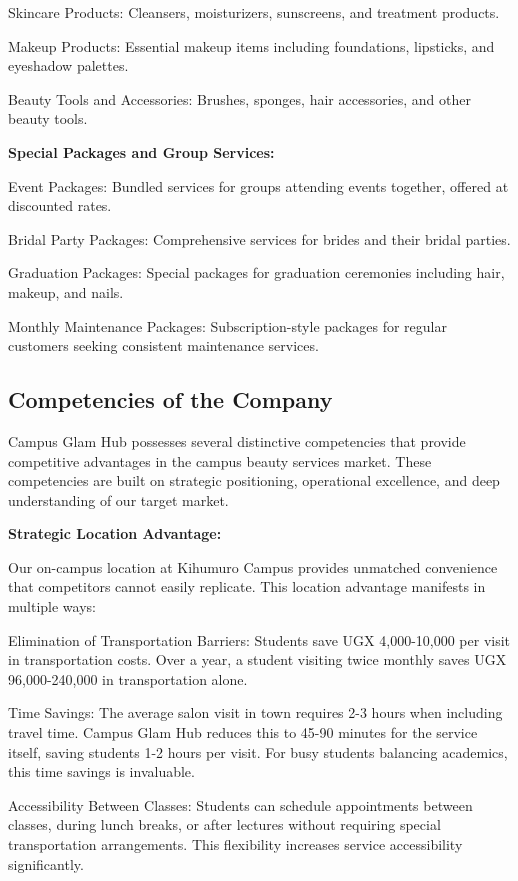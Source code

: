 \documentclass[a4paper,12pt]{article}
\begin{document}
Skincare Products: Cleansers, moisturizers, sunscreens, and treatment products.

Makeup Products: Essential makeup items including foundations, lipsticks, and eyeshadow palettes.

Beauty Tools and Accessories: Brushes, sponges, hair accessories, and other beauty tools.

\textbf{Special Packages and Group Services:}

Event Packages: Bundled services for groups attending events together, offered at discounted rates.

Bridal Party Packages: Comprehensive services for brides and their bridal parties.

Graduation Packages: Special packages for graduation ceremonies including hair, makeup, and nails.

Monthly Maintenance Packages: Subscription-style packages for regular customers seeking consistent maintenance services.

\subsection{Competencies of the Company}

Campus Glam Hub possesses several distinctive competencies that provide competitive advantages in the campus beauty services market. These competencies are built on strategic positioning, operational excellence, and deep understanding of our target market.

\textbf{Strategic Location Advantage:}

Our on-campus location at Kihumuro Campus provides unmatched convenience that competitors cannot easily replicate. This location advantage manifests in multiple ways:

Elimination of Transportation Barriers: Students save UGX 4,000-10,000 per visit in transportation costs. Over a year, a student visiting twice monthly saves UGX 96,000-240,000 in transportation alone.

Time Savings: The average salon visit in town requires 2-3 hours when including travel time. Campus Glam Hub reduces this to 45-90 minutes for the service itself, saving students 1-2 hours per visit. For busy students balancing academics, this time savings is invaluable.

Accessibility Between Classes: Students can schedule appointments between classes, during lunch breaks, or after lectures without requiring special transportation arrangements. This flexibility increases service accessibility significantly.
\end{document}

